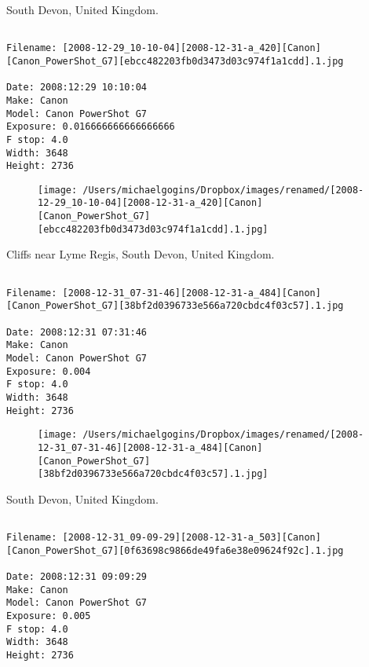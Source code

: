 \clearpage
\onecolumn
\noindent South Devon, United Kingdom.
\noindent
\begin{lstlisting}

Filename: [2008-12-29_10-10-04][2008-12-31-a_420][Canon][Canon_PowerShot_G7][ebcc482203fb0d3473d03c974f1a1cdd].1.jpg

Date: 2008:12:29 10:10:04
Make: Canon
Model: Canon PowerShot G7
Exposure: 0.016666666666666666
F stop: 4.0
Width: 3648
Height: 2736
\end{lstlisting}
\clearpage

\begin{figure}
\texttt{[image: /Users/michaelgogins/Dropbox/images/renamed/[2008-12-29\_10-10-04][2008-12-31-a\_420][Canon][Canon\_PowerShot\_G7][ebcc482203fb0d3473d03c974f1a1cdd].1.jpg]}
\end{figure}
    
\clearpage
\onecolumn
\noindent Cliffs near Lyme Regis, South Devon, United Kingdom.
\noindent
\begin{lstlisting}

Filename: [2008-12-31_07-31-46][2008-12-31-a_484][Canon][Canon_PowerShot_G7][38bf2d0396733e566a720cbdc4f03c57].1.jpg

Date: 2008:12:31 07:31:46
Make: Canon
Model: Canon PowerShot G7
Exposure: 0.004
F stop: 4.0
Width: 3648
Height: 2736
\end{lstlisting}
\clearpage

\begin{figure}
\texttt{[image: /Users/michaelgogins/Dropbox/images/renamed/[2008-12-31\_07-31-46][2008-12-31-a\_484][Canon][Canon\_PowerShot\_G7][38bf2d0396733e566a720cbdc4f03c57].1.jpg]}
\end{figure}
    
\clearpage
\onecolumn
\noindent South Devon, United Kingdom.
\noindent
\begin{lstlisting}

Filename: [2008-12-31_09-09-29][2008-12-31-a_503][Canon][Canon_PowerShot_G7][0f63698c9866de49fa6e38e09624f92c].1.jpg

Date: 2008:12:31 09:09:29
Make: Canon
Model: Canon PowerShot G7
Exposure: 0.005
F stop: 4.0
Width: 3648
Height: 2736
\end{lstlisting}
\clearpage

